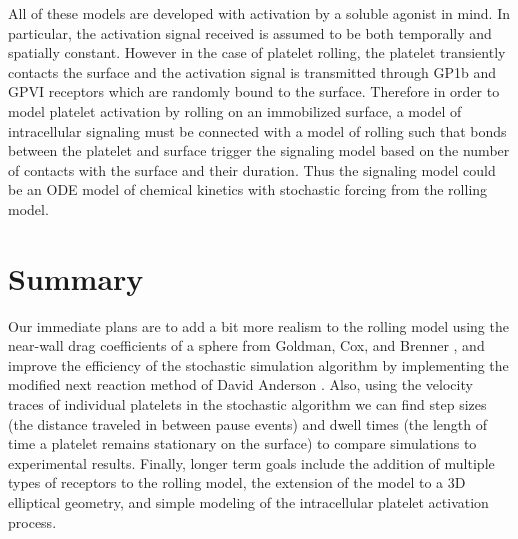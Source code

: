 All of these models are developed with activation by a soluble agonist
in mind. In particular, the activation signal received is assumed to
be both temporally and spatially constant. However in the case of
platelet rolling, the platelet transiently contacts the surface and
the activation signal is transmitted through GP1b and GPVI receptors
which are randomly bound to the surface. Therefore in order to model
platelet activation by rolling on an immobilized surface, a model of
intracellular signaling must be connected with a model of rolling such
that bonds between the platelet and surface trigger the signaling
model based on the number of contacts with the surface and their
duration. Thus the signaling model could be an ODE model of chemical
kinetics with stochastic forcing from the rolling model.

\section{Summary}
\label{sec:summary-future}

Our immediate plans are to add a bit more realism to the rolling model
using the near-wall drag coefficients of a sphere from Goldman, Cox,
and Brenner \cite{Goldman1967a,Goldman1967b}, and improve the
efficiency of the stochastic simulation algorithm by implementing the
modified next reaction method of David Anderson
\cite{Anderson2007}. Also, using the velocity traces of individual
platelets in the stochastic algorithm we can find step sizes (the
distance traveled in between pause events) and dwell times (the length
of time a platelet remains stationary on the surface) to compare
simulations to experimental results. Finally, longer term goals
include the addition of multiple types of receptors to the rolling
model, the extension of the model to a 3D elliptical geometry, and
simple modeling of the intracellular platelet activation process.


